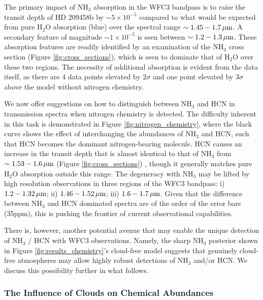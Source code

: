\documentclass[fleqn,usenatbib]{mnras}
\begin{document}
The primary impact of $\mathrm{NH_3}$ absorption in the WFC3 bandpass is to raise the transit depth of HD 209458b by $\sim 5 \times 10^{-5}$ compared to what would be expected from pure $\mathrm{H_{2}O}$ absorption (blue) over the spectral range $\sim 1.45-1.7 \,\hbox{$\mu$m}$. A secondary feature of magnitude $\sim 1 \times 10^{-5}$ is seen between  $\sim 1.2-1.3 \,\hbox{$\mu$m}$. These absorption features are readily identified by an examination of the $\mathrm{NH_3}$ cross section (Figure \ref{fig:cross_sections}), which is seen to dominate that of $\mathrm{H_{2}O}$ over these two regions. The necessity of additional absorption is evident from the data itself, as there are 4 data points elevated by $2\sigma$ and one point elevated by $3\sigma$ above the model without nitrogen chemistry.

We now offer suggestions on how to distinguish between $\mathrm{NH_3}$ and $\mathrm{HCN}$ in transmission spectra when nitrogen chemistry is detected. The difficulty inherent in this task is demonstrated in Figure \ref{fig:nitrogen_chemistry}, where the black curve shows the effect of interchanging the abundances of $\mathrm{NH_3}$ and $\mathrm{HCN}$, such that $\mathrm{HCN}$ becomes the dominant nitrogen-bearing molecule. $\mathrm{HCN}$ causes an increase in the transit depth that is almost identical to that of $\mathrm{NH_3}$ from $\sim 1.53-1.6 \,\hbox{$\mu$m}$ (Figure \ref{fig:cross_sections}) , though it generally matches pure $\mathrm{H_{2}O}$ absorption outside this range. The degeneracy with $\mathrm{NH_3}$ may be lifted by high resolution observations in three regions of the WFC3 bandpass: i) $1.2-1.32 \,\hbox{$\mu$m}$; ii) $1.46-1.52 \,\hbox{$\mu$m}$; iii) $1.6-1.7 \,\hbox{$\mu$m}$. Given that the difference between $\mathrm{NH_3}$ and $\mathrm{HCN}$ dominated spectra are of the order of the error bars (35ppm), this is pushing the frontier of current observational capabilities.

There is, however, another potential avenue that may enable the unique detection of $\mathrm{NH_3}$ / $\mathrm{HCN}$ with WFC3 observations. Namely, the sharp $\mathrm{NH_3}$ posterior shown in Figure \ref{fig:results_chemistry}'s cloud-free model suggests that genuinely cloud-free atmospheres may allow highly robust detections of $\mathrm{NH_3}$ and/or $\mathrm{HCN}$. We discuss this possibility further in what follows.

\subsubsection{The Influence of Clouds on Chemical Abundances}\label{subsubsection:influence_of_clouds}
\end{document}
